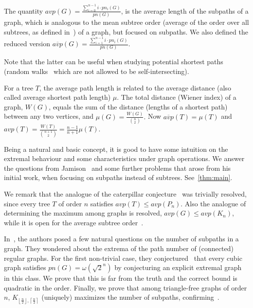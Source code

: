 \documentclass[a4paper,11pt]{article}
\newcommand*{\ceilfrac}[2]{\mathopen{}\left\lceil\frac{#1}{#2}\right\rceil\mathclose{}}
\newcommand*{\floorfrac}[2]{\mathopen{}\left\lfloor\frac{#1}{#2}\right\rfloor\mathclose{}}
\newcommand*{\avp}{avp}
\newcommand{\pn}{pn}
\begin{document}
The quantity $\avp(G)=\frac{ \sum_{i=0}^{n-1} i \cdot \pn_i(G) }{\pn(G)}$, is the average length of the subpaths of a graph, which is analogous to the mean subtree order (average of the order over all subtrees, as defined in~\cite{jamison_average_1983}) of a graph, but focused on subpaths.
We also defined the reduced version $\overline{\avp}(G)=\frac{ \sum_{i=1}^{n-1} i \cdot \pn_i(G) }{\overline{\pn}(G)}$.

Note that the latter can be useful when studying potential shortest paths (random walks~\cite{Lovasz96} which are not allowed to be self-intersecting).

For a tree $T$, the average path length is related to the average distance (also called average shortest path length) $\mu.$
The total distance (Wiener index) of a graph, $W(G)$, equals the sum of the distance (lengths of a shortest path) between any two vertices, and $\mu(G)=\frac{W(G)}{\binom n2}.$
Now $\overline{\avp}(T)=\mu(T)$ and
$\avp(T)=\frac{W(T)}{\binom{n+1}{2}}= \frac{n-1}{n+1}\mu(T).$



Being a natural and basic concept, it is good to have some intuition on the extremal behaviour and some characteristics under graph operations.
We answer the questions from Jamison~\cite{jamison_average_1983, jamison_monotonicity_1984} and some further problems that arose from his initial work, when focusing on subpaths instead of subtrees.
See~\cref{thm:main}.

We remark that the analogue of the caterpillar conjecture~\cite[Prob.~(7.1)]{jamison_average_1983} was trivially resolved, since every tree $T$ of order $n$ satisfies $ \avp(T) \le \avp(P_n)$. 
Also the analogue of determining the maximum among graphs is resolved, $ \avp(G) \le \avp(K_n)$,
while it is open for the average subtree order~\cite{CJW25}.




In~\cite{KSSY25}, the authors posed a few natural questions on the number of subpaths in a graph. They wondered about the extrema of the path number of (connected) regular graphs. For the first non-trivial case, they conjectured~\cite[Conj.~16]{KSSY25} that every cubic graph satisfies $\pn(G)=\omega\left( \sqrt 2 ^n\right)$ by conjecturing an explicit extremal graph in this class.
We prove that this is far from the truth and the correct bound is quadratic in the order.
Finally, we prove that among triangle-free graphs of order $n$, $K_{ \floorfrac n2, \ceilfrac n2}$ (uniquely) maximizes the number of subpaths, confirming~\cite[Conj.~18]{KSSY25}.
\end{document}
